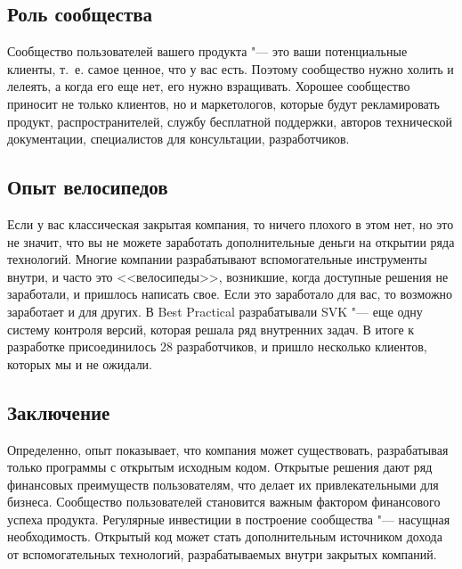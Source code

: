 \subsection*{Роль сообщества}

Сообщество пользователей вашего продукта "--- это ваши потенциальные клиенты,
т.~е. самое ценное, что у вас есть. Поэтому
сообщество нужно холить и лелеять, а когда его еще нет, его нужно
взращивать. Хорошее сообщество приносит не только клиентов, но и
маркетологов, которые будут рекламировать продукт, распространителей,
службу бесплатной поддержки, авторов технической документации,
специалистов для консультации, разработчиков.

\subsection*{Опыт велосипедов}

Если у вас классическая закрытая компания, то ничего плохого в этом нет, но
это не значит, что вы не можете заработать дополнительные деньги на открытии
ряда технологий. 
Многие компании разрабатывают вспомогательные инструменты внутри, и часто
это <<велосипеды>>, возникшие, когда доступные решения не заработали, и пришлось написать
свое. Если это заработало для вас, то возможно заработает и для других.
В Best Practical разрабатывали SVK "--- еще одну систему контроля версий,
которая решала ряд внутренних задач. В итоге к разработке присоединилось
28 разработчиков, и пришло несколько клиентов, которых мы и не ожидали.

\subsection*{Заключение}

Определенно, опыт показывает, что компания может существовать, разрабатывая
только программы с открытым исходным кодом. Открытые решения дают ряд
финансовых преимуществ пользователям, что делает их привлекательными для
бизнеса. Сообщество пользователей становится важным фактором финансового
успеха продукта. Регулярные инвестиции в построение сообщества "--- насущная
необходимость. Открытый код может стать дополнительным источником дохода
от вспомогательных технологий, разрабатываемых внутри закрытых компаний.






